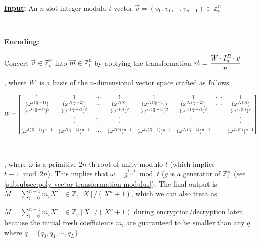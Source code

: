 \begin{tcolorbox}[title={\textbf{\tboxlabel{\ref*{subsec:bgv-encoding-decoding}} BGV's Encoding and Decoding}}]



\textbf{\underline{Input}:} An $n$-slot integer modulo $t$ vector $\vec{v} = (v_0, v_1, \cdots, v_{n-1}) \in \mathbb{Z}_t^n$

$ $

\textbf{\underline{Encoding}:} 

 Convert $\vec{v} \in \mathbb{Z}_t^n$ into $\vec{m} \in \mathbb{Z}_t^n$ by applying the transformation $\vec{m} = \dfrac{\tilde W \cdot I_n^R \cdot \vec{v}}{n}$

, where $\tilde W$ is a basis of the $n$-dimensional vector space crafted as follows: 

{\footnotesize{$\tilde W = \begin{bmatrix}
1 & 1 & \cdots & 1 & 1 & 1 & \cdots & 1\\
(\omega^{J(\frac{n}{2} - 1)}) & (\omega^{J(\frac{n}{2} - 2)}) & \cdots & (\omega^{J(0)}) & (\omega^{J_*(\frac{n}{2} - 1)}) & (\omega^{J_*(\frac{n}{2} - 2)}) & \cdots & (\omega^{J_*(0)})\\
(\omega^{J(\frac{n}{2} - 1)})^2 & (\omega^{J(\frac{n}{2} - 2)})^2 & \cdots & (\omega^{J(0)})^2 & (\omega^{J_*(\frac{n}{2} - 1)})^2 & (\omega^{J_*(\frac{n}{2} - 2)})^2 & \cdots & (\omega^{J_*(0)})^2 \\
\vdots & \vdots & \ddots & \vdots & \vdots & \ddots & \vdots & \vdots \\
(\omega^{J(\frac{n}{2} - 1)})^{n-1} & (\omega^{J(\frac{n}{2} - 2)})^{n-1} & \cdots & (\omega^{J(0)})^{n-1} & (\omega^{J_*(\frac{n}{2} - 1)})^{n-1} & (\omega^{J_*(\frac{n}{2} - 2)})^{n-1} & \vdots  & (\omega^{J_*(0)})^{n-1}
\end{bmatrix}$}}

$ $

, where $\omega$ is a primitive $2n$-th root of unity modulo $t$ (which implies $t \equiv 1 \bmod 2n$). This implies that $\omega = g^{\frac{t - 1}{2n}} \bmod t$ ($g$ is a generator of $\mathbb{Z}_t^{\times}$ (see \autoref{subsubsec:poly-vector-transformation-modulus}). The final output is $M = \sum\limits_{i=0}^{n-1} m_iX^i \text{ } \in \mathbb{Z}_t[X] / (X^n + 1)$, 
which we can also treat as 

$M = \sum\limits_{i=0}^{n-1} m_iX^i \text{ } \in \mathbb{Z}_q[X] / (X^n + 1)$ during encryption/decryption later, because the initial fresh coefficients $m_i$ are guaranteed to be smaller than any $q$ where $q = \{q_0, q_1, \cdots, q_L\}$.


\end{tcolorbox}
